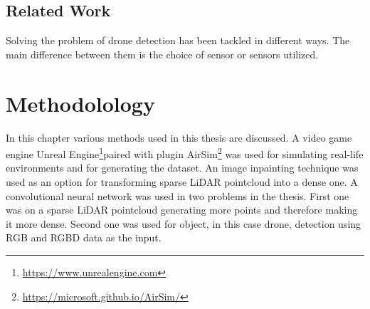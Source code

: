\documentclass[twoside]{ctuthesis}
\theoremstyle{plain}
\theoremstyle{definition}
\theoremstyle{note}
\begin{document}
\section{Related Work}
Solving the problem of drone detection has been tackled in different ways. The main difference between them is the choice of sensor or sensors utilized. 
\chapter{Methodolology}
In this chapter various methods used in this thesis are discussed. A video game engine Unreal Engine\footnote{\url{https://www.unrealengine.com}}paired with plugin AirSim\footnote{\url{https://microsoft.github.io/AirSim/}} was used for simulating real-life environments and for generating the dataset. An image inpainting technique was used as an option for transforming sparse LiDAR pointcloud into a dense one. A convolutional neural network was used in two problems in the thesis. First one was on a sparse LiDAR pointcloud generating more points and therefore making it more dense. Second one was used for object, in this case drone, detection using RGB and RGBD data as the input.
\end{document}
